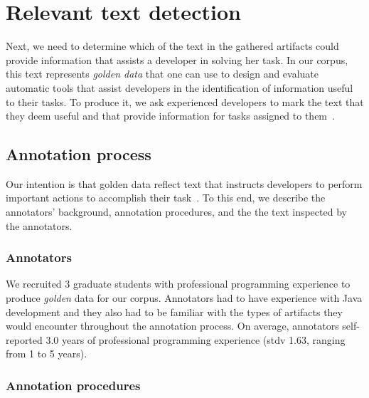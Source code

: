 


\section{Relevant text detection}
\label{cp4:corpus-relevant-text}






Next, we need to determine which 
of the text in the gathered artifacts could provide information that assists a developer in solving her task.
In our corpus, this text represents \textit{golden data} that one can use to design and evaluate automatic tools that assist developers in the identification of information useful to their tasks. 
To produce it, we 
ask experienced developers to
mark the text that they deem useful and that provide information for tasks assigned to them~\cite{nadi2020, Robillard2015, marques2020}.



\subsection{Annotation process}


Our intention is that golden data reflect text that instructs developers to perform important actions to accomplish their task~\cite{Robillard2015, Lotufo2012}.
To this end, we describe the annotators' background, annotation procedures, and the 
the text inspected by the annotators.
\textcolor{white}{\acs{stdv}} %





\subsubsection{Annotators}


We recruited 3 graduate students with professional programming experience to produce \textit{golden} data for our corpus. Annotators had to have experience with Java development and they also had to be familiar with the types of artifacts they would encounter throughout the annotation process. 
On average, annotators self-reported 3.0 years of professional
programming experience (stdv 1.63, ranging from 1 to 5 years).



\subsubsection{Annotation procedures}



